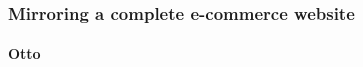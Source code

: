 






\subsubsection{Mirroring a complete e-commerce website}

















\paragraph{Otto}








